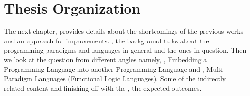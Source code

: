 \documentclass[thesis-solanki.tex]{subfiles}
\begin{document}
%






\section{Thesis Organization}

The next chapter,  provides details about the shortcomings of the
previous works and an approach for improvements.
, the background talks about the programming paradigms and languages
in general and the ones in question.
Then we look at the question from different angles namely, ,  Embedding
a Programming Language into another Programming Language and  , Multi
Paradigm Languages (Functional Logic Languages).
Some of the indirectly related content  and finishing off with the
, the expected outcomes.


\ifMain
\begin{scope}
  \nolinenumbers
  \enotesize
  \par
  \begin{singlespace}
  \setlength{\parskip}{12pt plus 2pt minus 1pt}
  \theendnotes
  \par
  \end{singlespace}
\end{scope}
\fi
\end{document}
